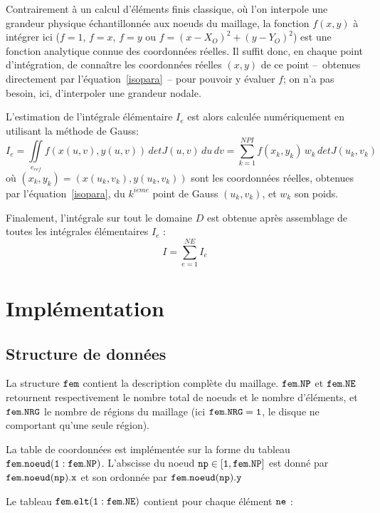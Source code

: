 \documentclass[a4paper, 10pt]{article}
\begin{document}
Contrairement à un calcul d'éléments finis classique, où l'on interpole une grandeur physique
échantillonnée aux noeuds du maillage, la fonction $f(x,y)$ à intégrer ici ($f=1$, $f=x$, $f=y$
ou $f=(x-X_O)^2+(y-Y_O)^2$) est une fonction analytique connue des coordonnées réelles. Il
suffit donc, en chaque point d'intégration, de connaître les coordonnées réelles $(x,y)$ de ce
point --~obtenues directement par l'équation~\eqref{isopara}~-- pour pouvoir y évaluer $f$; on
n'a pas besoin, ici, d'interpoler une grandeur nodale.

L'estimation de l'intégrale élémentaire $I_e$ est alors calculée numériquement en utilisant la
méthode de Gauss:
\begin{equation}
I_e=\iint\limits_{e_{ref}} f(x(u,v),y(u,v))\, detJ(u,v)\,  du \,  dv= \sum_{k=1}^{NPI} f(x_k, y_k)\, w_k \, detJ(u_k, v_k)
\label{Ie_expr}
\end{equation}
où $(x_k, y_k)=(x(u_k,v_k), y(u_k,v_k))$ sont les coordonnées réelles, obtenues par
l'équation~\eqref{isopara}, du $k^{ieme}$ point de Gauss $(u_k, v_k)$, et $w_k$ son poids.

Finalement, l'intégrale sur tout le domaine $D$ est obtenue après assemblage de toutes
les intégrales élémentaires $I_e$ :
\begin{equation}
I = \sum_{e=1}^{NE} I_e
\end{equation}

\section{Implémentation}
\subsection {Structure de données}

La structure $ \tt{fem }\rm$ contient la description complète du maillage. $ \tt{fem.NP }\rm$  et   $ \tt{fem.NE }\rm$ retournent respectivement le nombre total de noeuds et le nombre d'éléments, et $ \tt{fem.NRG}\rm$ le nombre de régions du maillage (ici $\tt{fem.NRG=1}\rm$, le disque ne comportant qu'une seule région).

La table de coordonnées est implémentée sur la forme du tableau $ \tt{fem.noeud(1:fem.NP)} \rm$.
L'abscisse du noeud $\tt{np \in [1,   fem.NP \rm]}$ est donné par $ \tt{fem.noeud(np).x} \rm$ et son
ordonnée par $ \tt{fem.noeud(np).y} \rm$

Le tableau $\tt{fem.elt(1:fem.NE)} \rm$ contient pour chaque élément $ \tt{ne}\rm$ :
\end{document}
